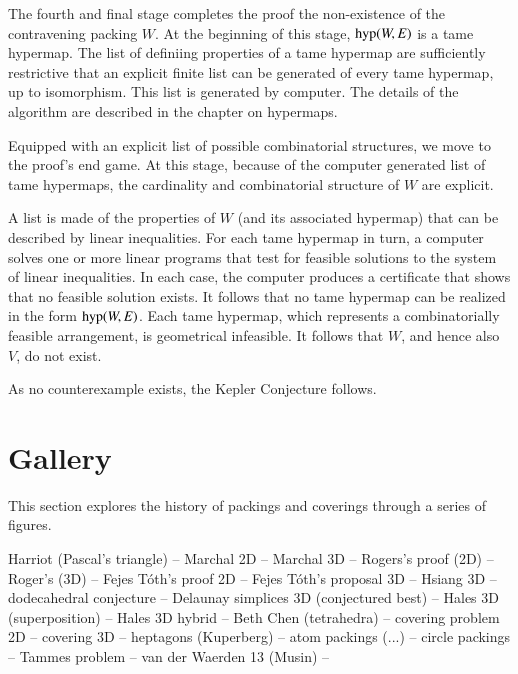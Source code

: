 The fourth and final stage completes the proof the non-existence of
the contravening packing $W$.  At the beginning of this stage,
${\operatorname{hyp}}(W,E)$ is a tame hypermap.  The list of definiing properties
of a tame hypermap are sufficiently restrictive that an explicit finite
list can be generated of every tame hypermap, up to isomorphism.  
This list is generated by computer.  The details of the algorithm are
described in the chapter on hypermaps.

Equipped with an explicit list of possible combinatorial structures,
we move to the proof's end game.  At this stage, because of the computer
generated list of tame hypermaps, the cardinality and
combinatorial structure of $W$ are explicit.

A list is made of the properties of $W$ (and its associated hypermap)
that can be described by linear inequalities.  For each tame hypermap
in turn, a computer solves one or more linear programs that test for
feasible solutions to the system of linear inequalities.  In each
case, the computer produces a certificate that shows that no feasible
solution exists.  It follows that no tame hypermap can be realized in
the form ${\operatorname{hyp}}(W,E)$.  Each tame hypermap, which represents a
combinatorially feasible arrangement, is geometrical infeasible.  It
follows that $W$, and hence also $V$, do not exist.

As no counterexample exists, the Kepler Conjecture follows.

\section{Gallery}

This section explores the history of packings and coverings through a
series of figures.

Harriot (Pascal's triangle) -- Marchal 2D -- Marchal 3D -- Rogers's
proof (2D) -- Roger's (3D) -- Fejes T\'oth's proof 2D -- Fejes
T\'oth's proposal 3D -- Hsiang 3D -- dodecahedral conjecture --
Delaunay simplices 3D (conjectured best) -- Hales 3D (superposition)
-- Hales 3D hybrid -- Beth Chen (tetrahedra) -- covering problem 2D --
covering 3D -- heptagons (Kuperberg) -- atom packings (...) -- circle
packings -- Tammes problem -- van der Waerden 13 (Musin) --
